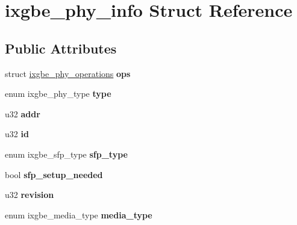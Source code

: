 \hypertarget{structixgbe__phy__info}{
\section{ixgbe\_\-phy\_\-info Struct Reference}
\label{structixgbe__phy__info}
}
\subsection*{Public Attributes}
\begin{DoxyCompactItemize}
\item 
\hypertarget{structixgbe__phy__info_a8d24f90947c2a763a5fb24b8cc4d8276}{
struct \hyperlink{structixgbe__phy__operations}{ixgbe\_\-phy\_\-operations} {\bfseries ops}}
\label{structixgbe__phy__info_a8d24f90947c2a763a5fb24b8cc4d8276}

\item 
\hypertarget{structixgbe__phy__info_a45397f7fc38754e31cea1e8945e88c15}{
enum ixgbe\_\-phy\_\-type {\bfseries type}}
\label{structixgbe__phy__info_a45397f7fc38754e31cea1e8945e88c15}

\item 
\hypertarget{structixgbe__phy__info_a9331700b1b7f210f3f987041309d1160}{
u32 {\bfseries addr}}
\label{structixgbe__phy__info_a9331700b1b7f210f3f987041309d1160}

\item 
\hypertarget{structixgbe__phy__info_af257105a034780e728812d09895e3a68}{
u32 {\bfseries id}}
\label{structixgbe__phy__info_af257105a034780e728812d09895e3a68}

\item 
\hypertarget{structixgbe__phy__info_ad3fbfd9644062a267baaf9d14e9e0dac}{
enum ixgbe\_\-sfp\_\-type {\bfseries sfp\_\-type}}
\label{structixgbe__phy__info_ad3fbfd9644062a267baaf9d14e9e0dac}

\item 
\hypertarget{structixgbe__phy__info_a3608df1a723722ce7b6d25996fb84441}{
bool {\bfseries sfp\_\-setup\_\-needed}}
\label{structixgbe__phy__info_a3608df1a723722ce7b6d25996fb84441}

\item 
\hypertarget{structixgbe__phy__info_a79373150ad3ef85a5f700e1c4231e960}{
u32 {\bfseries revision}}
\label{structixgbe__phy__info_a79373150ad3ef85a5f700e1c4231e960}

\item 
\hypertarget{structixgbe__phy__info_a14c59d6e8d7f4b992a156aabe11d8ce9}{
enum ixgbe\_\-media\_\-type {\bfseries media\_\-type}}
\label{structixgbe__phy__info_a14c59d6e8d7f4b992a156aabe11d8ce9}


\end{DoxyCompactItemize}
